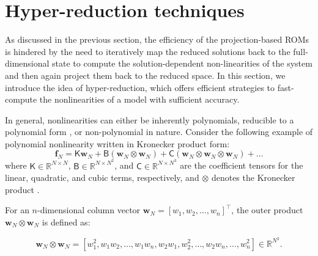 \documentclass[11pt]{article}
\newcommand{\mat}[1]{\mathsf{#1}}
\begin{document}
        \section{Hyper-reduction techniques}





        As discussed in the previous section, the efficiency of the projection-based ROMs is hindered by the need to iteratively map the reduced solutions back to the full-dimensional state to compute the solution-dependent non-linearities of the system and then again project them back to the reduced space.
        In this section, we introduce the idea of hyper-reduction, which offers efficient strategies to fast-compute the nonlinearities of a model with sufficient accuracy.



        In general, nonlinearities can either be inherently polynomials, reducible to a polynomial form \cite{gu2011qlmor}, or non-polynomial in nature.
        Consider the following example of polynomial nonlinearity written in Kronecker product form:
        \begin{equation}
        \mathbf{f}_N = \mat{K} \mathbf{w}_N + \mat{B} (\mathbf{w}_N \otimes \mathbf{w}_N) + \mat{C} (\mathbf{w}_N \otimes \mathbf{w}_N \otimes \mathbf{w}_N) + \dots
        \label{eq:poly_non}
        \end{equation}
        where $\mat{K} \in \mathbb{R}^{N \times N}$, $\mat{B} \in \mathbb{R}^{N \times N^2}$, and $\mat{C} \in \mathbb{R}^{N \times N^3}$ are the coefficient tensors for the linear, quadratic, and cubic terms, respectively, and $\otimes$ denotes the Kronecker product \cite{kolda2009tensor}.

        For an $n$-dimensional column vector $\mathbf{w}_N = [w_1, w_2, \dots, w_n]^\top$, the outer product $\mathbf{w}_N \otimes \mathbf{w}_N$ is defined as:

        \begin{equation}
        \mathbf{w}_N \otimes \mathbf{w}_N = [w_1^2, w_1w_2, \dots, w_1w_n, w_2w_1, w_2^2, \dots, w_2w_n, \dots, w_n^2] \in \mathbb{R}^{N^2}.
        \label{eq:op}
        \end{equation}
\end{document}
